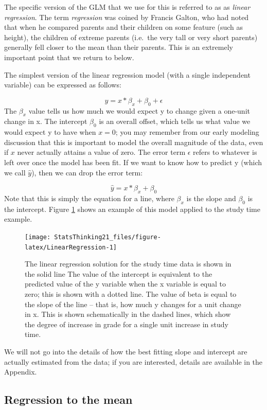 \documentclass[12pt,]{book}
\theoremstyle{definition}
\theoremstyle{definition}
\theoremstyle{definition}
\theoremstyle{remark}
\begin{document}
The specific version of the GLM that we use for this is referred to as as \emph{linear regression}. The term \emph{regression} was coined by Francis Galton, who had noted that when he compared parents and their children on some feature (such as height), the children of extreme parents (i.e.~the very tall or very short parents) generally fell closer to the mean than their parents. This is an extremely important point that we return to below.

The simplest version of the linear regression model (with a single independent variable) can be expressed as follows:

\[
y = x * \beta_x + \beta_0 + \epsilon
\]
The \(\beta_x\) value tells us how much we would expect y to change given a one-unit change in x. The intercept \(\beta_0\) is an overall offset, which tells us what value we would expect y to have when \(x=0\); you may remember from our early modeling discussion that this is important to model the overall magnitude of the data, even if \(x\) never actually attains a value of zero. The error term \(\epsilon\) refers to whatever is left over once the model has been fit. If we want to know how to predict y (which we call \(\hat{y}\)), then we can drop the error term:

\[
\hat{y} = x * \beta_x + \beta_0 
\]
Note that this is simply the equation for a line, where \(\beta_x\) is the slope and \(\beta_0\) is the intercept. Figure \ref{fig:LinearRegression} shows an example of this model applied to the study time example.

\begin{figure}
\texttt{[image: StatsThinking21\_files/figure-latex/LinearRegression-1]} \caption{The linear regression solution for the study time data is shown in the solid line The value of the intercept is equivalent to the predicted value of the y variable when the x variable is equal to zero; this is shown with a dotted line.  The value of beta is equal to the slope of the line -- that is, how much y changes for a unit change in x.  This is shown schematically in the dashed lines, which show the degree of increase in grade for a single unit increase in study time.}\label{fig:LinearRegression}
\end{figure}

We will not go into the details of how the best fitting slope and intercept are actually estimated from the data; if you are interested, details are available in the Appendix.

\hypertarget{regression-to-the-mean}{%
\subsection{Regression to the mean}\label{regression-to-the-mean}}
\end{document}
